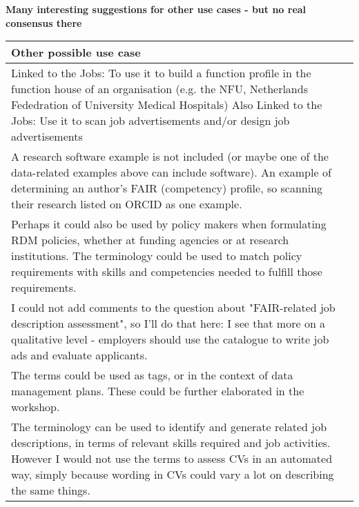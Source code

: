 \documentclass[]{article}
\begin{document}
\textbf{Many interesting suggestions for other use cases - but no real
consensus there}

\begin{table}[H]
\centering
\begin{tabular}{>{\raggedright\arraybackslash\columncolor{khaki}}p{30em}}
\hline
Other possible use case\\
\hline
Linked to the Jobs:  To use it to build a function profile in the function house of an organisation (e.g. the NFU, Netherlands Fededration of University Medical Hospitals)
Also Linked to the Jobs:  Use it to scan job advertisements and/or design job advertisements\\
\hline
A research software example is not included (or maybe one of the data-related examples above can include software). An example of determining an author's FAIR (competency) profile, so scanning their research listed on ORCID as one example.\\
\hline
Perhaps it could also be used by policy makers when formulating RDM policies, whether at funding agencies or at research institutions. The terminology could be used to match policy requirements with skills and competencies needed to fulfill those requirements.\\
\hline
I could not add comments to the question about "FAIR-related job description assessment", so I'll do that here: I see that more on a qualitative level - employers should use the catalogue to write job ads and evaluate applicants.\\
\hline
The terms could be used as tags, or in the context of data management plans. These could be further elaborated in the workshop.\\
\hline
The terminology can be used to identify and generate related job descriptions, in terms of relevant skills required and job activities. However I would not use the terms to assess CVs in an automated way, simply because wording in CVs could vary a lot on describing the same things. 


\end{tabular}
\end{table}
\end{document}
